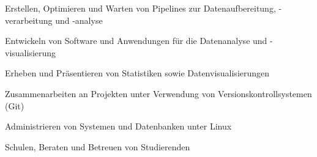 

\begin{cvskills}

  \begin{minipage}[t]{0.45\textwidth}
    \cvskill
      {Erstellen, Optimieren und Warten von Pipelines zur Datenaufbereitung, -verarbeitung und -analyse}
  \end{minipage}\hfill
  \begin{minipage}[t]{0.45\textwidth}
    \cvskill
      {Entwickeln von Software und Anwendungen für die Datenanalyse und -visualisierung}
  \end{minipage}

  \begin{minipage}[t]{0.45\textwidth}
    \cvskill
      {Erheben und Präsentieren von Statistiken sowie Datenvisualisierungen}
  \end{minipage}\hfill
  \begin{minipage}[t]{0.45\textwidth}
    \cvskill
      {Zusammenarbeiten an Projekten unter Verwendung von Versionskontrollsystemen (Git)}
  \end{minipage}

  \begin{minipage}[t]{0.45\textwidth}
    \cvskill
      {Administrieren von Systemen und Datenbanken unter Linux}
  \end{minipage}\hfill
  \begin{minipage}[t]{0.45\textwidth}
    \cvskill
      {Schulen, Beraten und Betreuen von Studierenden}
  \end{minipage}

\end{cvskills}